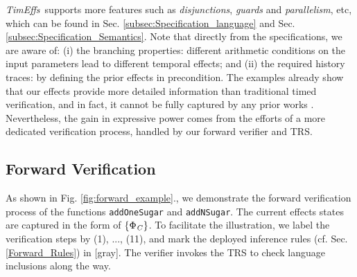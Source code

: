 \documentclass[acmsmall,10pt,review]{acmart}
\newcommand{\codem}[1]{{\lstinline[basicstyle=\small\ttfamily]|#1|}}
\newcommand{\timedEffects}{\emph{TimEffs}}
\newcommand{\effect}{{\ensuremath{\mathrm{\Phi}}}}
\newcommand{\code}[1]{{\tt{\ensuremath{\m{#1}}}}}
\newcommand{\m}{\mathit}
\newcommand\figref[1]{Fig. \textcolor{black}{\ref{#1}}.}
\newcommand\secref[1]{Sec. \textcolor{black}{\ref{#1}}}
\begin{document}
\timedEffects\ supports more features such as \emph{disjunctions}, 
\emph{guards} and \emph{parallelism}, etc, which can be found in 
\secref{subsec:Specification_language} and 
\secref{subsec:Specification_Semantics}.  
Note that directly from the specifications, we are aware of:  
(i) the branching properties: different arithmetic conditions on the input parameters lead to different temporal effects;
and (ii) the required history traces: by defining the prior effects 
in precondition. 
The examples 
already show that our  effects provide more detailed information than 
traditional timed verification, and in fact, it cannot be fully 
captured by any prior works \cite{DBLP:journals/tse/WangSWQ17,DBLP:journals/sttt/LarsenPY97,DBLP:journals/sttt/Yovine97,DBLP:conf/seke/WangWH05}.
Nevertheless, the gain in expressive power comes from the efforts 
of a more dedicated verification process, handled by our forward verifier and TRS.








\subsection{Forward Verification}
As shown in \figref{fig:forward_example}, we demonstrate the 
forward verification process of the functions \codem{addOneSugar} and   {\codem{addNSugar}}.
The current effects states are captured 
in the form of 
\code{\{ \textcolor{darklavender}{\effect_C} \}}. 
To facilitate the illustration, we label the verification 
steps by (1), ..., (11), and mark the deployed inference 
rules (cf. \secref{Forward_Rules}) in \textcolor{mGray}{[gray]}.
The verifier invokes the TRS to check language inclusions along the way.


\begin{comment}
  
/*require n>=0, _^*
  ensure  t>=n, Sugar#t */
{  
    
  
    
    
\end{comment}
\end{document}
